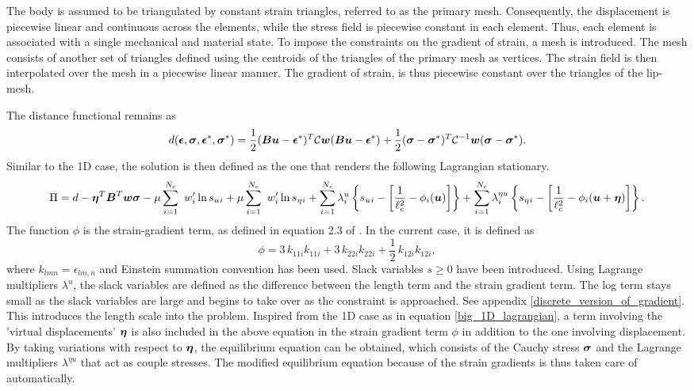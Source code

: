 \documentclass[10pt]{cas-sc}
\begin{document}
The body is assumed to be triangulated by constant strain triangles, referred to as the primary mesh. Consequently, the displacement is piecewise linear and continuous across the elements, while the stress field is piecewise constant in each element. Thus, each element is associated with a single mechanical and material state. To impose the constraints on the gradient of strain, a  mesh is introduced. The  mesh consists of another set of  triangles defined using the centroids of the triangles of the primary mesh as vertices. The strain field is then interpolated over the  mesh in a piecewise linear manner. The gradient of strain, is thus piecewise constant over the triangles of the lip-mesh.

The distance functional remains as
\begin{equation}
	d(\mbox{\boldmath $\epsilon$},\mbox{\boldmath $\sigma$},\mbox{\boldmath $\epsilon$}^*,\mbox{\boldmath $\sigma$}^*) = \frac{1}{2}(\mbox{\boldmath $B$} \mbox{\boldmath $u$} - \mbox{\boldmath $\epsilon$}^*)^T\mathcal{C}\mbox{\boldmath $w$}(\mbox{\boldmath $B$} \mbox{\boldmath $u$} - \mbox{\boldmath $\epsilon$}^*) + \frac{1}{2}(\mbox{\boldmath $\sigma$} - \mbox{\boldmath $\sigma$}^*)^T\mathcal{C}^{-1}\mbox{\boldmath $w$}(\mbox{\boldmath $\sigma$} - \mbox{\boldmath $\sigma$}^*).
\end{equation}
Similar to the 1D case, the solution is then defined as the one that renders the following Lagrangian stationary.
\begin{equation}
	\Pi  = d -\mbox{\boldmath $\eta$} ^T \mbox{\boldmath $B$}^T \mbox{\boldmath $w$} \mbox{\boldmath $\sigma$} - \mu \sum_{i=1}^{N_c} \
	w_i' \ln s_u{_i} + \mu \sum_{i=1}^{N_c} \
	w_i' \ln s_\eta{_i} +\sum_{i=1}^{N_c} \lambda^u_i \left\{ s_u{_i}  - \left[ \frac{1}{\ell_c ^2}- \phi_i(\mbox{\boldmath $u$}) \right]  \right\} 
	+\sum_{i=1}^{N_c} \lambda^{\eta u}_ i \left\{ s_\eta{_i}  - \left[ \frac{1}{\ell_c ^2}- \phi_i(\mbox{\boldmath $u$}+\mbox{\boldmath $\eta$}) \right]  \right\}.
\end{equation}
The function $\phi$ is the strain-gradient term, as defined in equation 2.3 of \cite{Mindlin1968}. In the current case, it is defined as 
\begin{equation}
	\phi = 3\,k_{11i}k_{11i}	+ 3\,k_{22i}k_{22i}	+ \frac{1}{2}\,k_{12i}k_{12i}, \label{mindlin_energy}
\end{equation}
where $k_{lmn} = \epsilon_{lm,n}$ and Einstein summation convention has been used. Slack variables $s \geq 0$ have been introduced. Using Lagrange multipliers $\lambda^u$, the slack variables are defined as the difference between the length term and the strain gradient term. The log term stays small as the slack variables are large and begins to take over as the constraint is approached. See appendix \ref{discrete_version_of_gradient}. This introduces the length scale into the problem. Inspired from the 1D case as in equation \eqref{big_1D_lagrangian}, a term involving the 'virtual displacements' $\mbox{\boldmath $\eta$}$ is also included in the above equation in the strain gradient term $\phi$ in addition to the one involving displacement. By taking variations with respect to $\mbox{\boldmath $\eta$}$, the equilibrium equation can be obtained, which consists of the Cauchy stress $\mbox{\boldmath $\sigma$}$ and the Lagrange multipliers $\lambda^{\eta u}$ that act as couple stresses. The modified equilibrium equation because of the strain gradients is thus taken care of automatically.
\end{document}
